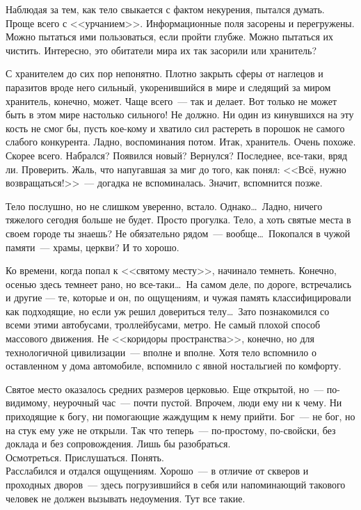 Наблюдая за тем, как тело свыкается с фактом некурения, пытался думать. Проще 
всего с <<урчанием>>. Информационные поля засорены и перегружены. Можно пытаться 
ими пользоваться, если пройти глубже. Можно пытаться их чистить. Интересно, это 
обитатели мира их так засорили или хранитель?

С хранителем до сих пор непонятно. Плотно закрыть сферы от наглецов и паразитов 
вроде него сильный, укоренившийся в мире и следящий за миром хранитель, конечно, 
может. Чаще всего~--- так и делает. Вот только не может быть в этом мире 
настолько 
сильного! Не должно. Ни один из кинувшихся на эту кость не смог бы, пусть 
кое-кому и хватило сил растереть в порошок не самого слабого конкурента. Ладно, 
воспоминания потом. Итак, хранитель. Очень похоже. Скорее всего. Набрался? 
Появился новый? Вернулся? Последнее, все-таки, вряд ли. Проверить. Жаль, что 
напугавшая за миг до того, как понял: <<Всё, нужно возвращаться!>>~--- догадка 
не 
вспоминалась. Значит, вспомнится позже.

Тело послушно, но не слишком уверенно, встало. Однако\ldots\ Ладно, ничего тяжелого 
сегодня больше не будет. Просто прогулка. Тело, а хоть святые места в своем 
городе ты знаешь? Не обязательно рядом~--- вообще\ldots\ Покопался в чужой 
памяти~--- 
храмы, церкви? И то хорошо.

Ко времени, когда попал к <<святому месту>>, начинало темнеть. Конечно, осенью 
здесь темнеет рано, но все-таки\ldots\ На самом деле, по дороге, встречались и другие 
--- те, которые и он, по ощущениям, и чужая память классифицировали как 
подходящие, но если уж решил довериться телу\ldots\ Зато познакомился со всеми этими 
автобусами, троллейбусами, метро. Не самый плохой способ массового движения. Не 
<<коридоры пространства>>, конечно, но для технологичной цивилизации~--- вполне 
и 
вполне. Хотя тело вспомнило о оставленном у дома автомобиле, вспомнило с явной 
ностальгией по комфорту.

Святое место оказалось средних размеров церковью. Еще открытой, но~--- 
по-видимому, неурочный час~--- почти пустой. Впрочем, люди ему ни к чему. Ни 
приходящие к богу, ни помогающие жаждущим к нему прийти. Бог~--- не бог, но на 
стук ему уже не открыли. Так что теперь~--- по-простому, по-свойски, без доклада 
и 
без сопровождения. Лишь бы разобраться.\\

Осмотреться. Прислушаться. Понять.\\

Расслабился и отдался ощущениям. Хорошо~--- в отличие от скверов и проходных 
дворов~--- здесь погрузившийся в себя или напоминающий такового человек не 
должен 
вызывать недоумения. Тут все такие.


